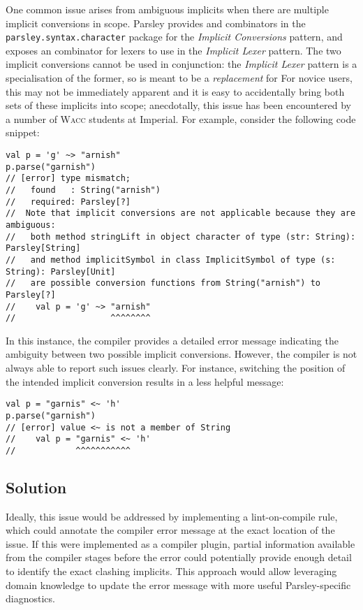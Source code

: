 \documentclass[../../main.tex]{subfiles}
\begin{document}
One common issue arises from ambiguous implicits when there are multiple implicit conversions in scope.
Parsley provides  and  combinators in the \texttt{parsley.syntax.character} package for the \emph{Implicit Conversions} pattern,
and exposes an  combinator for lexers to use in the \emph{Implicit Lexer} pattern.
The two implicit conversions cannot be used in conjunction: the \emph{Implicit Lexer} pattern is a specialisation of the former, so  is meant to be a \emph{replacement} for 
For novice users, this may not be immediately apparent and it is easy to accidentally bring both sets of these implicits into scope; anecdotally, this issue has been encountered by a number of \textsc{Wacc} students at Imperial.
For example, consider the following code snippet:
\begin{verbatim}
val p = 'g' ~> "arnish"
p.parse("garnish")
// [error] type mismatch;
//   found   : String("arnish")
//   required: Parsley[?]
//  Note that implicit conversions are not applicable because they are ambiguous:
//   both method stringLift in object character of type (str: String): Parsley[String]
//   and method implicitSymbol in class ImplicitSymbol of type (s: String): Parsley[Unit]
//   are possible conversion functions from String("arnish") to Parsley[?]
//    val p = 'g' ~> "arnish"
//                   ^^^^^^^^
\end{verbatim}
%
In this instance, the compiler provides a detailed error message indicating the ambiguity between two possible implicit conversions.
However, the compiler is not always able to report such issues clearly. For instance, switching the position of the intended implicit conversion results in a less helpful message:
\begin{verbatim}
val p = "garnis" <~ 'h'
p.parse("garnish")
// [error] value <~ is not a member of String
//    val p = "garnis" <~ 'h'
//            ^^^^^^^^^^^
\end{verbatim}

\subsection{Solution}
Ideally, this issue would be addressed by implementing a lint-on-compile rule, which could annotate the compiler error message at the exact location of the issue.
If this were implemented as a compiler plugin, partial information available from the compiler stages before the error could potentially provide enough detail to identify the exact clashing implicits.
This approach would allow leveraging domain knowledge to update the error message with more useful Parsley-specific diagnostics.
\end{document}
